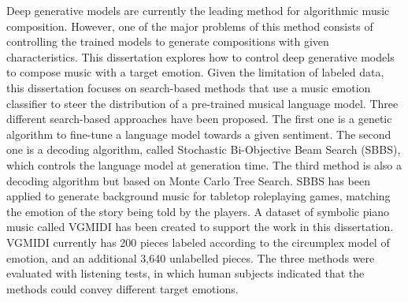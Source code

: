 Deep generative models are currently the leading method for algorithmic music composition. However, one of the major problems of this method consists of controlling the trained models to generate compositions with given characteristics. This dissertation explores how to control deep generative models to compose music with a target emotion. Given the limitation of labeled data, this dissertation focuses on search-based methods that use a music emotion classifier to steer the distribution of a pre-trained musical language model. Three different search-based approaches have been proposed. The first one is a genetic algorithm to fine-tune a language model towards a given sentiment. The second one is a decoding algorithm, called Stochastic Bi-Objective Beam Search (SBBS), which controls the language model at generation time. The third method is also a decoding algorithm but based on Monte Carlo Tree Search. SBBS has been applied to generate background music for tabletop roleplaying games, matching the emotion of the story being told by the players. A dataset of symbolic piano music called VGMIDI has been created to support the work in this dissertation. VGMIDI currently has 200 pieces labeled according to the circumplex model of emotion, and an additional 3,640 unlabelled pieces. The three methods were evaluated with listening tests, in which human subjects indicated that the methods could convey different target emotions.

